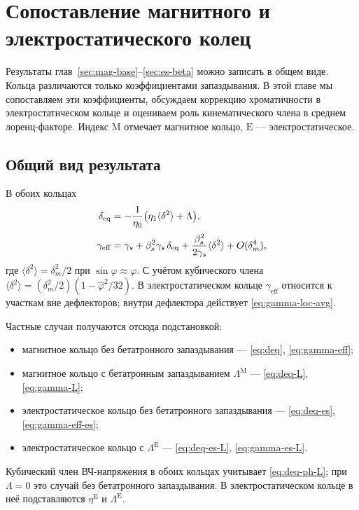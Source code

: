 \section{Сопоставление магнитного и электростатического колец}
\label{sec:compare}

Результаты глав~\ref{sec:mag-base}--\ref{sec:es-beta} можно записать в общем виде. Кольца различаются только коэффициентами запаздывания. В этой главе мы сопоставляем эти коэффициенты, обсуждаем коррекцию хроматичности в электростатическом кольце и оцениваем роль кинематического члена в среднем лоренц-факторе. Индекс $\mathrm{M}$ отмечает магнитное кольцо, $\mathrm{E}$ --- электростатическое.

\subsection{Общий вид результата}

В обоих кольцах
\begin{equation}
\label{eq:cmp-master}
\begin{aligned}
\delta_{\mathrm{eq}}
&=-\frac{1}{\eta_0}\bigl(\eta_1\langle\delta^2\rangle+\Lambda\bigr),\\[2pt]
\gamma_{\mathrm{eff}}
&=\gamma_s+\beta_s^2\gamma_s\,\delta_{\mathrm{eq}}
+\frac{\beta_s^2}{2\gamma_s}\langle\delta^2\rangle+O(\delta_m^4),
\end{aligned}
\end{equation}
где $\langle\delta^2\rangle=\delta_m^2/2$ при $\sin\varphi\approx\varphi$. С учётом кубического члена $\langle\delta^2\rangle=(\delta_m^2/2)(1-\hat\varphi^2/32)$. В электростатическом кольце $\gamma_{\mathrm{eff}}$ относится к участкам вне дефлекторов; внутри дефлектора действует \eqref{eq:gamma-loc-avg}.

Частные случаи получаются отсюда подстановкой:
\begin{itemize}
\item магнитное кольцо без бетатронного запаздывания --- \eqref{eq:deq}, \eqref{eq:gamma-eff};
\item магнитное кольцо с бетатронным запаздыванием $\Lambda^{\mathrm{M}}$ --- \eqref{eq:deq-L}, \eqref{eq:gamma-L};
\item электростатическое кольцо без бетатронного запаздывания --- \eqref{eq:deq-es}, \eqref{eq:gamma-eff-es};
\item электростатическое кольцо с $\Lambda^{\mathrm{E}}$ --- \eqref{eq:deq-es-L}, \eqref{eq:gamma-es-L}.
\end{itemize}
Кубический член ВЧ-напряжения в обоих кольцах учитывает \eqref{eq:deq-ph-L}; при $\Lambda=0$ это случай без бетатронного запаздывания. В электростатическом кольце в неё подставляются $\eta^{\mathrm{E}}$ и $\Lambda^{\mathrm{E}}$.

